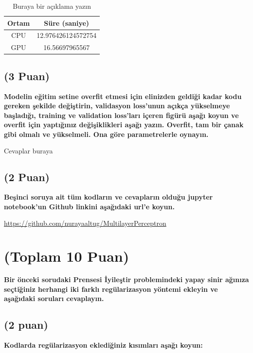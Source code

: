 \documentclass[11pt]{article}
\begin{document}
\begin{table}[ht!]
    \centering
    \caption{Buraya bir açıklama yazın}
    \begin{tabular}{c|c}
        Ortam & Süre (saniye) \\\hline
        CPU & 12.976426124572754  \\
        GPU & 16.56697965567\\
    \end{tabular}
    \label{tab:my_table}
\end{table}

\subsection{(3 Puan)} \textbf{Modelin eğitim setine overfit etmesi için elinizden geldiği kadar kodu gereken şekilde değiştirin, validasyon loss'unun açıkça yükselmeye başladığı, training ve validation loss'ları içeren figürü aşağı koyun ve overfit için yaptığınız değişiklikleri aşağı yazın. Overfit, tam bir çanak gibi olmalı ve yükselmeli. Ona göre parametrelerle oynayın.}

Cevaplar buraya

\subsection{(2 Puan)} \textbf{Beşinci soruya ait tüm kodların ve cevapların olduğu jupyter notebook'un Github linkini aşağıdaki url'e koyun.}

\url{https://github.com/nurayaaltug/MultilayerPerceptron}

\section{(Toplam 10 Puan)} \textbf{Bir önceki sorudaki Prensesi İyileştir problemindeki yapay sinir ağınıza seçtiğiniz herhangi iki farklı regülarizasyon yöntemi ekleyin ve aşağıdaki soruları cevaplayın.} 

\subsection{(2 puan)} \textbf{Kodlarda regülarizasyon eklediğiniz kısımları aşağı koyun:} 
\end{document}
